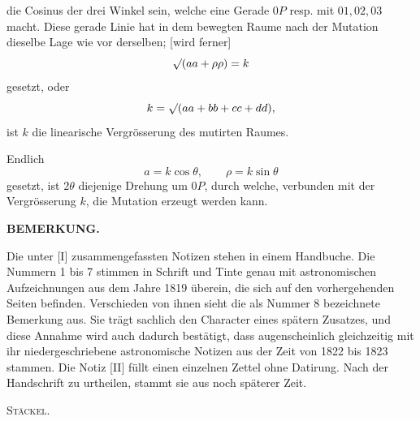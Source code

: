 %
\noindent die Cosinus der drei Winkel sein, welche eine Gerade $0P$ resp. mit $01,02,03$ macht. Diese gerade Linie hat in dem bewegten Raume nach der Mutation dieselbe Lage wie vor derselben; [wird ferner]
\[
\mathord{\surd}(aa+\rho\rho)=k
\]
gesetzt, oder
\[
k=\mathord{\surd}(aa+bb+cc+dd),
\]
ist $k$ die linearische Vergrösserung des mutirten Raumes.

Endlich
\[
a=k\cos\theta,\qquad \rho=k\sin\theta
\]
gesetzt, ist $2\theta$ diejenige Drehung um $0P$, durch welche, verbunden mit der Vergrösserung $k$, die Mutation erzeugt werden kann.

\begin{center}\bfseries BEMERKUNG.\end{center}

Die unter [I] zusammengefassten Notizen stehen in einem Handbuche. Die Nummern 1 bis 7 stimmen in Schrift und Tinte genau mit astronomischen Aufzeichnungen aus dem Jahre 1819 überein, die sich auf den vorhergehenden Seiten befinden. Verschieden von ihnen sieht die als Nummer 8 bezeichnete Bemerkung aus. Sie trägt sachlich den Character eines spätern Zusatzes, und diese Annahme wird auch dadurch bestätigt, dass augenscheinlich gleichzeitig mit ihr niedergeschriebene astronomische Notizen aus der Zeit von 1822 bis 1823 stammen. Die Notiz [II] füllt einen einzelnen Zettel ohne Datirung. Nach der Handschrift zu urtheilen, stammt sie aus noch späterer Zeit.
\begin{flushright}\textsc{Stäckel.}\end{flushright}
